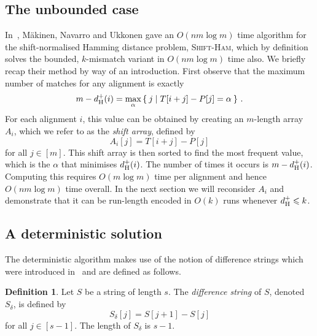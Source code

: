 \documentclass[11pt]{article}
\renewcommand{\leq}{\leqslant}
\newcommand{\sHam}{\textsc{Shift-Ham}\xspace}
\newcommand{\DsHam}{\ensuremath{d_\textup{H}^+}}
\newcommand{\dHam}{\DsHam}
\theoremstyle{plain}
\theoremstyle{definition}
\newtheorem{definition}[theorem]{Definition}
\begin{document}
\subsection{The unbounded case}\label{sec:unbounded}

In~\cite{MNU:2005}, M\"{a}kinen, Navarro and Ukkonen gave an $O(nm \log m)$ time algorithm for the shift-normalised Hamming distance problem, \sHam, which by definition solves the bounded, $k$-mismatch variant in  $O(nm \log m)$ time also. We briefly recap their method by way of an introduction. First observe that the maximum number of matches for any alignment is exactly
\begin{equation*}
    m - \dHam(i)  =  \max_\alpha \Set{ j | T[{i+j}]-P[j]=\alpha }\,.
\end{equation*}
For each alignment $i$, this value can be obtained by creating an $m$-length array $A_i$, which we refer to as the \emph{shift array}, defined by
\begin{equation}
    \label{eq:shiftarray}
    A_i[j]= T[{i+j}]-P[j]
\end{equation}
for all $j\in [m]$. This shift array is then sorted to find the most frequent value, which is the $\alpha$ that minimises $\dHam(i)$. The number of times it occurs is $m-\dHam(i)$. Computing this requires $O(m \log m)$ time per alignment and hence $O(nm \log m)$ time overall. In the next section we will reconsider $A_i$ and demonstrate that it can be run-length encoded in $O(k)$ runs whenever $\dHam\leq k$.


\subsection{A deterministic solution}\label{sec:detkmis}

The deterministic algorithm makes use of the notion of difference strings which were introduced in~\cite{LU:2000} and are defined as follows.

\begin{definition}
    \label{dfn:diffstr}
    Let $S$ be a string of length $s$. The \emph{difference string} of $S$, denoted $S_{\delta}$, is defined by
\begin{equation*}
        S_\delta[j]=S[j+1]-S[j]
    \end{equation*}
for all $j\in [s-1]$. The length of $S_{\delta}$ is $s-1$.
\end{definition}
\end{document}
